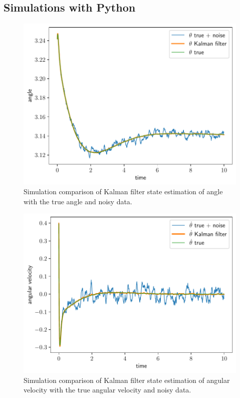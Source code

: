 \documentclass[]{article}
\begin{document}
\subsection{Simulations with Python}
\begin{figure}[H]
	\centering
	\includegraphics[width=0.8\linewidth]{KFangle.pdf}
	\caption{Simulation comparison of Kalman filter state estimation of angle with the true angle and noisy data.}
	\label{fig:kfangle}
\end{figure}

\begin{figure}[H]
	\centering
	\includegraphics[width=0.8\linewidth]{KFangular_velocity.pdf}
	\caption{Simulation comparison of Kalman filter state estimation of angular velocity with the true angular velocity and noisy data.}
	\label{fig:kfangvel}
\end{figure}
\end{document}
